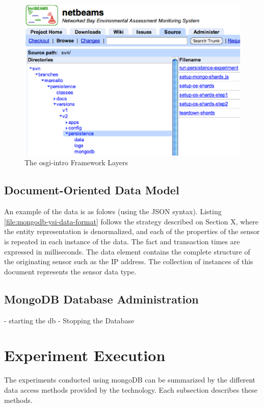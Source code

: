 \begin{figure}[!h]
  \centering
  \includegraphics[scale=0.5]{../diagrams/dsp-persistence-system-dir}
  \caption{The osgi-intro Framework Layers}
  \label{fig:dsp-persistence-system-dir}
\end{figure}

\subsection{Document-Oriented Data Model}

An example of the data is as folows (using the JSON syntax). Listing
\ref{file:mongodb-ysi-data-format} follows the strategy described on Section X,
where the entity representation is denormalized, and each of the properties of
the sensor is repeated in each instance of the data. The fact and transaction
times are expressed in milliseconds. The data element contains the complete
structure of the originating sensor such as the IP address. The collection of
instances of this document represents the sensor data type.

\subsection{MongoDB Database Administration}

- starting the db
- Stopping the Database

\section{Experiment Execution}
\label{sec:experiment-execution}

The experiments conducted using mongoDB can be summarized by the different
data access methods provided by the technology. Each subsection describes these
methods.

